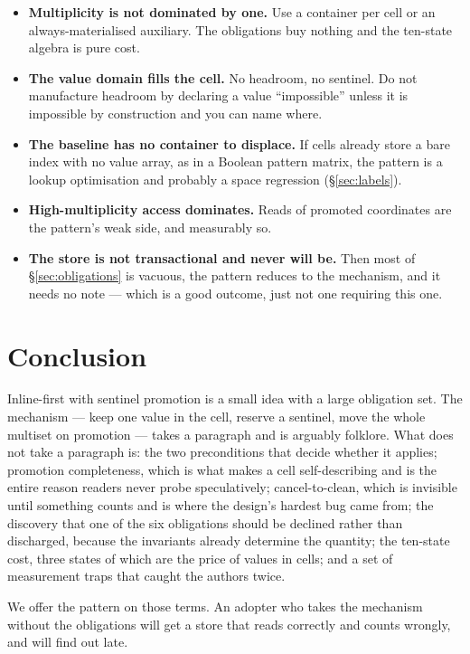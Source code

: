 \documentclass[11pt,a4paper]{article}
\theoremstyle{plain}
\theoremstyle{definition}
\theoremstyle{remark}
\begin{document}
\begin{itemize}
  \item \textbf{Multiplicity is not dominated by one.} Use a container per cell
    or an always-materialised auxiliary. The obligations buy nothing and the
    ten-state algebra is pure cost.
  \item \textbf{The value domain fills the cell.} No headroom, no sentinel. Do
    not manufacture headroom by declaring a value ``impossible'' unless it is
    impossible by construction and you can name where.
  \item \textbf{The baseline has no container to displace.} If cells already
    store a bare index with no value array, as in a Boolean pattern matrix, the
    pattern is a lookup optimisation and probably a space regression
    (\S\ref{sec:labels}).
  \item \textbf{High-multiplicity access dominates.} Reads of promoted
    coordinates are the pattern's weak side, and measurably so.
  \item \textbf{The store is not transactional and never will be.} Then most of
    \S\ref{sec:obligations} is vacuous, the pattern reduces to the mechanism,
    and it needs no note --- which is a good outcome, just not one requiring
    this one.
\end{itemize}

\section{Conclusion}

Inline-first with sentinel promotion is a small idea with a large obligation
set. The mechanism --- keep one value in the cell, reserve a sentinel, move the
whole multiset on promotion --- takes a paragraph and is arguably folklore. What
does not take a paragraph is: the two preconditions that decide whether it
applies; promotion completeness, which is what makes a cell self-describing and
is the entire reason readers never probe speculatively; cancel-to-clean, which
is invisible until something counts and is where the design's hardest bug came
from; the discovery that one of the six obligations should be declined rather
than discharged, because the invariants already determine the quantity; the
ten-state cost, three states of which are the price of values in cells; and a
set of measurement traps that caught the authors twice.

We offer the pattern on those terms. An adopter who takes the mechanism without
the obligations will get a store that reads correctly and counts wrongly, and
will find out late.
\end{document}
